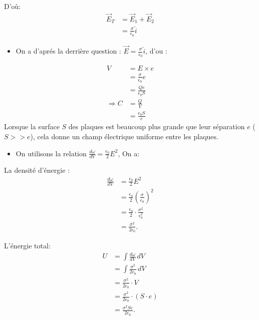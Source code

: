 \documentclass[12pt]{article}
\begin{document}
\begin{correctionbox}
	\noindent D'où:
	\begin{align*}
		\vec{E}_T & = \vec{E}_1 + \vec{E}_2             \\
		          & = \frac{\sigma}{\epsilon_0} \hat{i}
	\end{align*}
	\begin{itemize}
		\item On a d'aprés la derrière question : $\vec{E} =\frac{\sigma}{\epsilon_0} \hat{i}  $, d'ou :
	\end{itemize}
	\begin{align*}
		V             & = E \times e                  \\
		              & = \frac{\sigma}{\epsilon_0} e \\
		              & = \frac{Qe}{\epsilon_0 S}     \\
		\Rightarrow C & = \frac{Q}{V}                 \\
		              & = \frac{\epsilon_0 S}{e}
	\end{align*}
	\noindent Lorsque la surface $S$ des plaques est beaucoup plus grande que leur séparation $e$ ($S>>e$), cela donne un champ électrique uniforme entre les plaques.

	\begin{itemize}
		\item On utilisons la relation $\frac{d \omega}{dV} = \frac{\epsilon_0}{2}E^2$, On a:
	\end{itemize}

	\noindent La densité d'énergie :
	\begin{align*}
		\frac{d\omega}{dV} & = \frac{\epsilon_0}{2} E^2                                        \\
		                   & = \frac{\epsilon_0}{2} \left( \frac{\sigma}{\epsilon_0} \right)^2 \\
		                   & = \frac{\epsilon_0}{2} \cdot \frac{\sigma^2}{\epsilon_0^2}        \\
		                   & = \frac{\sigma^2}{2\epsilon_0}.
	\end{align*}

	\noindent L'énergie total:
	\begin{align*}
		U & = \int \frac{d\omega}{dV} \, dV                  \\
		  & = \int \frac{\sigma^2}{2\epsilon_0} \, dV        \\
		  & = \frac{\sigma^2}{2\epsilon_0} \cdot V           \\
		  & = \frac{\sigma^2}{2\epsilon_0} \cdot (S \cdot e) \\
		  & = \frac{\sigma^2 S e}{2\epsilon_0}.
	\end{align*}
\end{correctionbox}
\end{document}
